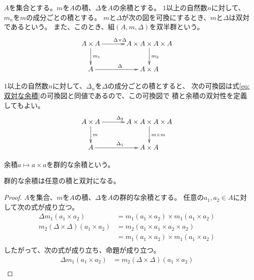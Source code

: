 	\begin{definition}[双半群]\label{def:双半群} %
		$A$を集合とする。$m$を$A$の積、$\Delta$を$A$の余積とする。
		$1$以上の自然数$n$に対して、$m_n$を$m$の成分ごとの積とする。
		$m$と$\Delta$が次の図を可換にするとき、$m$と$\Delta$は双対であるという。
		また、このとき、組$(A,m,\Delta)$を双半群という。
		\begin{equation}\label{eq:双対な余積}\xymatrix@C+2ex{
			A\times A \ar[d]^{m_1} \ar[r]^{\Delta\times \Delta} & A\times A\times A\times A \ar[d]^{m_2} \\
			A \ar[r]^{\Delta} & A\times A \\
		}\end{equation}
	\end{definition} %

	$1$以上の自然数$n$に対して、$\Delta_n$を$\Delta$の成分ごとの積とすると、
	次の可換図は式\eqref{eq:双対な余積}の可換図と同値であるので、この可換図で
	積と余積の双対性を定義してもよい。
	\begin{equation}\xymatrix@C+2ex{
		A\times A \ar[d]^{m} \ar[r]^{\Delta_2} & A\times A\times A\times A \ar[d]^{m\times m} \\
		A \ar[r]^{\Delta_1} & A\times A \\
	}\end{equation}

	\begin{definition}[群的な余積]\label{def:群的な余積} %
		余積$a\mapsto a\times a$を群的な余積という。
	\end{definition} %

	\begin{proposition}[群的な余積の双対性]\label{pro:群的な余積の双対性} %
		群的な余積は任意の積と双対になる。
	\end{proposition} %
	\begin{proof} %
		$A$を集合、$m$を$A$の積、$\Delta$を$A$の群的な余積とする。
		任意の$a_1,a_2\in A$に対して次の式が成り立つ。
		\begin{equation*}\begin{split} %
			\Delta m_1(a_1\times a_2) &= m_1(a_1\times a_2)\times m_1(a_1\times a_2) \\
			m_2(\Delta\times \Delta)(a_1\times a_2) &= m_2(a_1\times a_1\times a_2\times a_2) \\
				&= m_1(a_1\times a_2)\times m_1(a_1\times a_2) \\
		\end{split}\end{equation*} %
		したがって、次の式が成り立ち、命題が成り立つ。
		\begin{equation*}\begin{split} %
			\Delta m_1(a_1\times a_2) &= m_2(\Delta\times \Delta)(a_1\times a_2) \\
		\end{split}\end{equation*} %
	\end{proof} %

